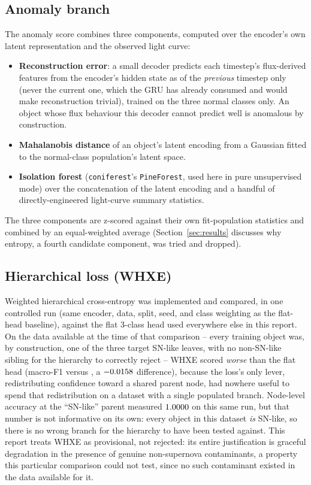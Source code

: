 \subsection{Anomaly branch}

The anomaly score combines three components, computed over the encoder's
own latent representation and the observed light curve:
\begin{itemize}
  \item \textbf{Reconstruction error}: a small decoder predicts each
    timestep's flux-derived features from the encoder's hidden state as of
    the \emph{previous} timestep only (never the current one, which the GRU
    has already consumed and would make reconstruction trivial), trained on
    the three normal classes only. An object whose flux behaviour this
    decoder cannot predict well is anomalous by construction.
  \item \textbf{Mahalanobis distance} of an object's latent encoding from a
    Gaussian fitted to the normal-class population's latent space.
  \item \textbf{Isolation forest} (\texttt{coniferest}'s \texttt{PineForest},
    used here in pure unsupervised mode) over the concatenation of the
    latent encoding and a handful of directly-engineered light-curve summary
    statistics.
\end{itemize}
The three components are z-scored against their own fit-population
statistics and combined by an equal-weighted average
(Section~\ref{sec:results} discusses why entropy, a fourth candidate
component, was tried and dropped).

\subsection{Hierarchical loss (WHXE)}

Weighted hierarchical cross-entropy \citep{villar2023whxe} was implemented
and compared, in one controlled run (same encoder, data, split, seed, and
class weighting as the flat-head baseline), against the flat 3-class head
used everywhere else in this report. On the data available at the time of
that comparison -- every training object was, by construction, one of the
three target SN-like leaves, with no non-SN-like sibling for the hierarchy
to correctly reject -- WHXE scored \emph{worse} than the flat head
(macro-F1 \TierWHXEMacroFFull{} versus \TierLCOnlyMacroFFull{}, a
$-0.0158{}$ difference), because the loss's only lever, redistributing
confidence toward a shared parent node, had nowhere useful to spend that
redistribution on a dataset with a single populated branch. Node-level
accuracy at the ``SN-like'' parent measured $1.0000{}$ on this
same run, but that number is not informative on its own: every object in
this dataset \emph{is} SN-like, so there is no wrong branch for the
hierarchy to have been tested against. This report treats WHXE as
provisional, not rejected: its entire justification is graceful degradation
in the presence of genuine non-supernova contaminants, a property this
particular comparison could not test, since no such contaminant existed in
the data available for it.

